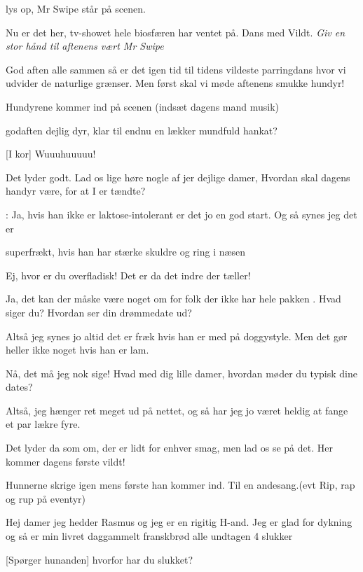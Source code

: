 \documentclass[a4paper,11pt]{article}
\begin{document}
\begin{sketch}

\scene lys op, Mr Swipe står på scenen.

 Nu er det her, tv-showet hele biosfæren har ventet på. Dans med Vildt. \emph{Giv en stor hånd til aftenens vært Mr Swipe}

 God aften alle sammen så er det igen tid til tidens vildeste parringdans hvor vi udvider de naturlige grænser. Men først skal vi møde aftenens smukke hundyr! 

\scene Hundyrene kommer ind på scenen (indsæt dagens mand musik)

 godaften dejlig dyr, klar til endnu en lækker mundfuld hankat?

[I kor] Wuuuhuuuuu!

 Det lyder godt. Lad os lige høre nogle af jer dejlige damer, Hvordan skal dagens handyr være, for at I er tændte? 

: Ja, hvis han ikke er laktose-intolerant er det jo en god start. Og så synes jeg det er 

superfrækt, hvis han har stærke skuldre og ring i næsen

 Ej, hvor er du overfladisk! Det er da det indre der tæller!

 Ja, det kan der måske være noget om for folk der ikke har hele pakken . Hvad siger du? Hvordan ser din drømmedate ud?

 Altså jeg synes jo altid det er fræk hvis han er med på doggystyle. Men det gør heller ikke noget hvis han er lam.

 Nå, det må jeg nok sige! Hvad med dig lille damer, hvordan møder du typisk dine dates?

 Altså, jeg hænger ret meget ud på nettet, og så har jeg jo været heldig at fange et par lækre fyre.

 Det lyder da som om, der er lidt for enhver smag, men lad os se på det. Her kommer dagens første vildt!

\scene Hunnerne skrige igen mens første han kommer ind. Til en andesang.(evt Rip, rap og rup på eventyr)

 Hej damer jeg hedder Rasmus og jeg er en rigitig H-and. Jeg er glad for dykning og så er min livret daggammelt franskbrød alle undtagen 4 slukker

[Spørger hunanden] hvorfor har du slukket?


\end{sketch}
\end{document}
